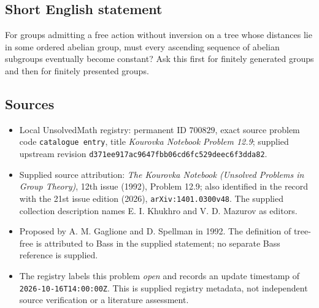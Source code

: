 \documentclass[11pt]{article}
\begin{document}
\subsection{Short English statement}
For groups admitting a free action without inversion on a tree whose distances lie in some ordered abelian group, must every ascending sequence of abelian subgroups eventually become constant? Ask this first for finitely generated groups and then for finitely presented groups.
\subsection{Sources}
\begin{itemize}
\item Local UnsolvedMath registry: permanent ID \(700829\), exact source problem code \texttt{catalogue entry}, title \emph{Kourovka Notebook Problem 12.9}; supplied upstream revision \texttt{d371ee917ac9647fbb06cd6fc529deec6f3dda82}.
\item Supplied source attribution: \emph{The Kourovka Notebook (Unsolved Problems in Group Theory)}, 12th issue (1992), Problem 12.9; also identified in the record with the 21st issue edition (2026), \texttt{arXiv:1401.0300v48}. The supplied collection description names E. I. Khukhro and V. D. Mazurov as editors.
\item Proposed by A. M. Gaglione and D. Spellman in 1992. The definition of tree-free is attributed to Bass in the supplied statement; no separate Bass reference is supplied.
\item The registry labels this problem \emph{open} and records an update timestamp of \texttt{2026-10-16T14:00:00Z}. This is supplied registry metadata, not independent source verification or a literature assessment.
\end{itemize}
\end{document}
